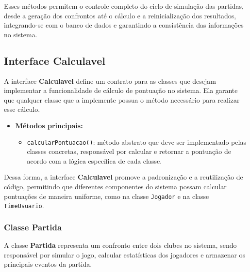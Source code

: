 \documentclass[12pt]{article}
\begin{document}
Esses métodos permitem o controle completo do ciclo de simulação das partidas, desde a geração dos confrontos até o cálculo e a reinicialização dos resultados, integrando-se com o banco de dados e garantindo a consistência das informações no sistema.

\subsection{Interface Calculavel}

A interface \textbf{Calculavel} define um contrato para as classes que desejam implementar a funcionalidade de cálculo de pontuação no sistema. Ela garante que qualquer classe que a implemente possua o método necessário para realizar esse cálculo.

\begin{itemize}
  \item \textbf{Métodos principais:}
        \begin{itemize}
          \item \texttt{calcularPontuacao()}: método abstrato que deve ser implementado pelas classes concretas, responsável por calcular e retornar a pontuação de acordo com a lógica específica de cada classe.
        \end{itemize}
\end{itemize}

Dessa forma, a interface \textbf{Calculavel} promove a padronização e a reutilização de código, permitindo que diferentes componentes do sistema possam calcular pontuações de maneira uniforme, como na classe \texttt{Jogador} e na classe \texttt{TimeUsuario}.

\subsubsection{Classe Partida}

A classe \textbf{Partida} representa um confronto entre dois clubes no sistema, sendo responsável por simular o jogo, calcular estatísticas dos jogadores e armazenar os principais eventos da partida.
\end{document}
